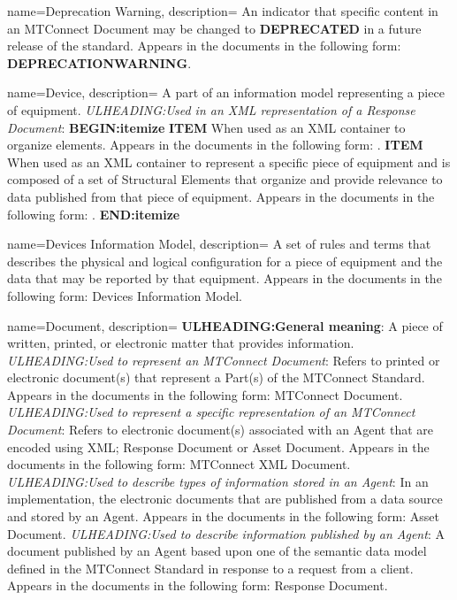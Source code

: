 {
    name={Deprecation Warning},
	description={
	An indicator that specific content in an \gls{MTConnect Document} may be changed to \textbf{DEPRECATED} in a future release of the standard.
	Appears in the documents in the following form: \textbf{DEPRECATIONWARNING}.
}
}

{
    name={Device},
	description={
	A part of an information model representing a piece of equipment.  
	\textit{ULHEADING:Used in an XML representation of a \gls{Response Document}}:
    \textbf{BEGIN:itemize}
	\textbf{ITEM} When used as an XML container to organize  elements.
	Appears in the documents in the following form: .
	\textbf{ITEM} When used as an XML container to represent a specific piece of equipment and is composed of a set of \glspl{Structural Element} that organize and provide relevance to data published from that piece of equipment.
	Appears in the documents in the following form: .
	\textbf{END:itemize}
}
}

{
    name={Devices Information Model},
	description={
	A set of rules and terms that describes the physical and logical configuration for a piece of equipment and the data that may be reported by that equipment.    
	Appears in the documents in the following form: \gls{Devices Information Model}.
}
}

{
    name={Document},
	description={
	\textbf{ULHEADING:General meaning}:
	A piece of written, printed, or electronic matter that provides information.
	\textit{ULHEADING:Used to represent an \gls{MTConnect Document}}:
	Refers to printed or electronic document(s) that represent a \gls{Part}(s) of the MTConnect Standard.
	Appears in the documents in the following form: \gls{MTConnect Document}.
	\textit{ULHEADING:Used to represent a specific representation of an \gls{MTConnect Document}}:
	Refers to electronic document(s) associated with an \gls{Agent} that are encoded using XML; \gls{Response Document} or \gls{Asset Document}.
	Appears in the documents in the following form: \gls{MTConnect XML Document}.
	\textit{ULHEADING:Used to describe types of information stored in an \gls{Agent}}:
	In an implementation, the electronic documents that are published from a data source and stored by an \gls{Agent}.
	Appears in the documents in the following form: \gls{Asset Document}.
	\textit{ULHEADING:Used to describe information published by an \gls{Agent}}:
	A document published by an \gls{Agent} based upon one of the \gls{semantic data model} defined in the MTConnect Standard in response to a request from a client.  
	Appears in the documents in the following form: \gls{Response Document}.
}
}

